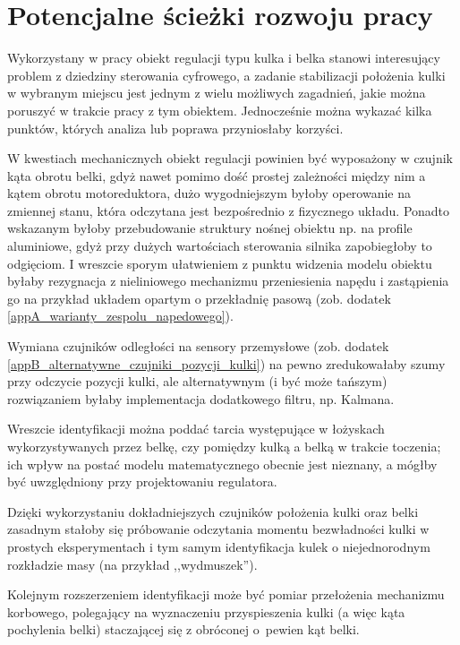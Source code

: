 \section{Potencjalne ścieżki rozwoju pracy}

Wykorzystany w pracy obiekt regulacji typu kulka i belka stanowi interesujący problem z dziedziny sterowania cyfrowego, a zadanie stabilizacji położenia kulki w wybranym miejscu jest jednym z wielu możliwych zagadnień, jakie można poruszyć w trakcie pracy z tym obiektem. Jednocześnie można wykazać kilka punktów, których analiza lub poprawa przyniosłaby korzyści.

W kwestiach mechanicznych obiekt regulacji powinien być wyposażony w czujnik kąta obrotu belki, gdyż nawet pomimo dość prostej zależności między nim a kątem obrotu motoreduktora, dużo wygodniejszym byłoby operowanie na zmiennej stanu, która odczytana jest bezpośrednio z fizycznego układu. Ponadto wskazanym byłoby przebudowanie struktury nośnej obiektu np. na profile aluminiowe, gdyż przy dużych wartościach sterowania silnika zapobiegłoby to odgięciom. I wreszcie sporym ułatwieniem z punktu widzenia modelu obiektu byłaby rezygnacja z nieliniowego mechanizmu przeniesienia napędu i zastąpienia go na przykład układem opartym o przekładnię pasową (zob. dodatek \ref{appA_warianty_zespolu_napedowego}).

Wymiana czujników odległości na sensory przemysłowe (zob. dodatek \ref{appB_alternatywne_czujniki_pozycji_kulki}) na pewno zredukowałaby szumy przy odczycie pozycji kulki, ale alternatywnym (i być może tańszym) rozwiązaniem byłaby implementacja dodatkowego filtru, np. Kalmana.

Wreszcie identyfikacji można poddać tarcia występujące w łożyskach wykorzystywanych przez belkę, czy pomiędzy kulką a belką w trakcie toczenia; ich wpływ na postać modelu matematycznego obecnie jest nieznany, a mógłby być uwzględniony przy projektowaniu regulatora.

Dzięki wykorzystaniu dokładniejszych czujników położenia kulki oraz belki zasadnym stałoby się próbowanie odczytania momentu bezwładności kulki w prostych eksperymentach i tym samym identyfikacja kulek o niejednorodnym rozkładzie masy (na przykład ,,wydmuszek'').

Kolejnym rozszerzeniem identyfikacji może być pomiar przełożenia mechanizmu korbowego, polegający na wyznaczeniu przyspieszenia kulki (a więc kąta pochylenia belki) staczającej się z obróconej o~pewien kąt belki.

